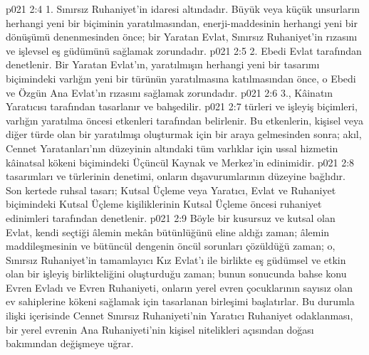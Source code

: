 \vs p021 2:4 1. Sınırsız Ruhaniyet’in idaresi altındadır. Büyük veya küçük unsurların herhangi yeni bir biçiminin yaratılmasından, enerji\hyp{}maddesinin herhangi yeni bir dönüşümü denenmesinden önce; bir Yaratan Evlat, Sınırsız Ruhaniyet’in rızasını ve işlevsel eş güdümünü sağlamak zorundadır.
\vs p021 2:5 2.\bibnobreakspace {} Ebedi Evlat tarafından denetlenir. Bir Yaratan Evlat’ın, yaratılmışın herhangi yeni bir tasarımı biçimindeki varlığın yeni bir türünün yaratılmasına katılmasından önce, o Ebedi ve Özgün Ana Evlat’ın rızasını sağlamak zorundadır.
\vs p021 2:6 3.\bibnobreakspace {}, Kâinatın Yaratıcısı tarafından tasarlanır ve bahşedilir.
\vs p021 2:7  türleri ve işleyiş biçimleri, varlığın yaratılma öncesi etkenleri tarafından belirlenir. Bu etkenlerin, kişisel veya diğer türde olan bir yaratılmışı oluşturmak için bir araya gelmesinden sonra; akıl, Cennet Yaratanları’nın düzeyinin altındaki tüm varlıklar için ussal hizmetin kâinatsal kökeni biçimindeki Üçüncül Kaynak ve Merkez’in edinimidir.
\vs p021 2:8  tasarımları ve türlerinin denetimi, onların dışavurumlarının düzeyine bağlıdır. Son kertede ruhsal tasarı; Kutsal Üçleme veya Yaratıcı, Evlat ve Ruhaniyet biçimindeki Kutsal Üçleme kişiliklerinin Kutsal Üçleme öncesi ruhaniyet edinimleri tarafından denetlenir.
\vs p021 2:9 Böyle bir kusursuz ve kutsal olan Evlat, kendi seçtiği âlemin mekân bütünlüğünü eline aldığı zaman; âlemin maddileşmesinin ve bütüncül dengenin öncül sorunları çözüldüğü zaman; o, Sınırsız Ruhaniyet’in tamamlayıcı Kız Evlat’ı ile birlikte eş güdümsel ve etkin olan bir işleyiş birlikteliğini oluşturduğu zaman; bunun sonucunda bahse konu Evren Evladı ve Evren Ruhaniyeti, onların yerel evren çocuklarının sayısız olan ev sahiplerine kökeni sağlamak için tasarlanan birleşimi başlatırlar. Bu durumla ilişki içerisinde Cennet Sınırsız Ruhaniyeti’nin Yaratıcı Ruhaniyet odaklanması, bir yerel evrenin Ana Ruhaniyeti’nin kişisel nitelikleri açısından doğası bakımından değişmeye uğrar.
